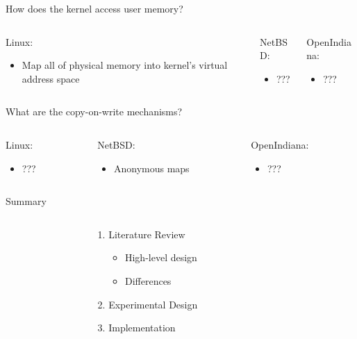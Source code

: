 \documentclass[aspectratio=169]{beamer}
\newcommand{\bi}{\begin{itemize}}
\newcommand{\ei}{\end{itemize}}
\newcommand{\bn}{\begin{enumerate}}
\newcommand{\en}{\end{enumerate}}
\begin{document}
\begin{frame}{How does the kernel access user memory?}
  \begin{columns}[T]
    \begin{column}{0.3\textwidth}
      Linux:
      \bi
    \item Map all of physical memory into kernel's virtual address space
      \ei
    \end{column}
    \pause
    \begin{column}{0.4\textwidth}
      NetBSD:
      \bi
    \item ???
      \ei
    \end{column}
    \pause
    \begin{column}{0.3\textwidth}
      OpenIndiana:
      \bi
    \item ???
      \ei
    \end{column}
  \end{columns}
\end{frame}

\begin{frame}{What are the copy-on-write mechanisms?}
  \begin{columns}[T]
    \begin{column}{0.3\textwidth}
      Linux:
      \bi
    \item ???
      \ei
    \end{column}
    \pause
    \begin{column}{0.4\textwidth}
      NetBSD:
      \bi
    \item Anonymous maps
      \ei
    \end{column}
    \pause
    \begin{column}{0.3\textwidth}
      OpenIndiana:
      \bi
    \item ???
      \ei
    \end{column}
  \end{columns}
\end{frame}

\begin{frame}{Summary}
  \begin{columns}[T]
    \begin{column}{0.2\textwidth}
    \end{column}
    \begin{column}{0.6\textwidth}
      \bn
    \item Literature Review
      \bi
    \item High-level design
    \item Differences
      \ei
    \item Experimental Design
    \item Implementation
      \en
    \end{column}
    \begin{column}{0.2\textwidth}
    \end{column}
  \end{columns}
\end{frame}
\end{document}
